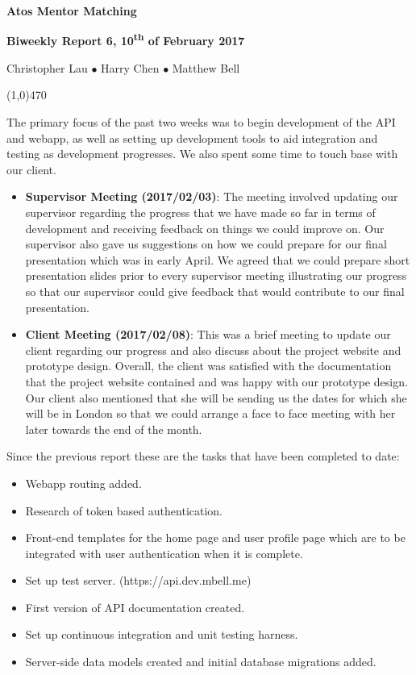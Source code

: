 \documentclass[11pt]{report}
\begin{document}
\centerline{{\LARGE \bf Atos Mentor Matching}}

\centerline{\large \bf Biweekly Report 6, 10\textsuperscript{th} of February 2017}
\centerline{Christopher Lau $\bullet$ Harry Chen $\bullet$ Matthew Bell }
\noindent
\line(1,0){470}\\


\smallskip

\noindent
The primary focus of the past two weeks was to begin development of the API and
webapp, as well as setting up development tools to aid integration and testing
as development progresses. We also spent some time to touch base with our
client.

\bigskip
{}
\smallskip

\noindent
\begin{itemize}
    \item \textbf{Supervisor Meeting (2017/02/03)}: The meeting involved
        updating our supervisor regarding the progress that we have made so far
        in terms of development and receiving feedback on things we could
        improve on. Our supervisor also gave us suggestions on how we could
        prepare for our final presentation which was in early April. We agreed
        that we could prepare short presentation slides prior to every
        supervisor meeting illustrating our progress so that our supervisor
        could give feedback that would contribute to our final presentation.
    \item \textbf{Client Meeting (2017/02/08)}: This was a brief meeting to
        update our client regarding our progress and also discuss about the
        project website and prototype design. Overall, the client was satisfied
        with the documentation that the project website contained and was happy
        with our prototype design. Our client also mentioned that she will be
        sending us the dates for which she will be in London so that we could
        arrange a face to face meeting with her later towards the end of the
        month.
\end{itemize}

\bigskip
{}
\smallskip

\noindent
Since the previous report these are the tasks that have been completed to date:
\begin{itemize}
    \item Webapp routing added.
    \item Research of token based authentication.
    \item Front-end templates for the home page and user profile page which are to be integrated with user authentication when it is complete.
    \item Set up test server. (https://api.dev.mbell.me)
    \item First version of API documentation created.
    \item Set up continuous integration and unit testing harness.
    \item Server-side data models created and initial database migrations added.
\end{itemize}
\end{document}
